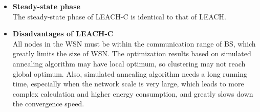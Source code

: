 \documentclass[11pt]{report}
\begin{document}
	\begin{itemize}
		\item \textbf{Steady-state phase}\\
		The steady-state phase of LEACH-C is identical to that of LEACH.
	\end{itemize}
	
	\begin{itemize}
		\item \textbf{Disadvantages of LEACH-C}\\   
		All nodes in the WSN must be within the communication range of BS, which greatly limits the size of WSN. The optimization results based on simulated annealing algorithm may have local optimum, so clustering may not reach global optimum. Also, simulated annealing algorithm needs a long running time, especially when the network scale is very large, which leads to more complex calculation and higher energy consumption, and greatly slows down the convergence speed. 
	\end{itemize}
	
\end{document}
